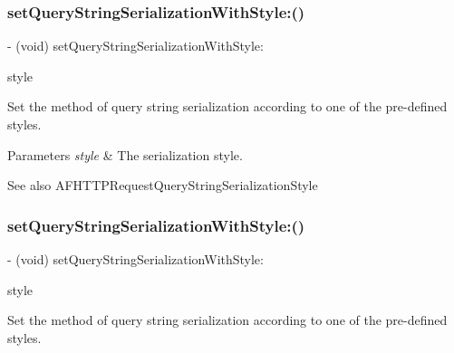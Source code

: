 \subsubsection{\texorpdfstring{set\+Query\+String\+Serialization\+With\+Style\+:()}{setQueryStringSerializationWithStyle:()}\hspace{0.1cm}{\footnotesize\ttfamily [1/3]}}
{\footnotesize\ttfamily -\/ (void) set\+Query\+String\+Serialization\+With\+Style\+: \begin{DoxyParamCaption}\item[{(A\+F\+H\+T\+T\+P\+Request\+Query\+String\+Serialization\+Style)}]{style }\end{DoxyParamCaption}}

Set the method of query string serialization according to one of the pre-\/defined styles.


\begin{DoxyParams}{Parameters}
{\em style} & The serialization style.\\
\hline
\end{DoxyParams}
\begin{DoxySeeAlso}{See also}
A\+F\+H\+T\+T\+P\+Request\+Query\+String\+Serialization\+Style 
\end{DoxySeeAlso}
\mbox{\label{interface_a_f_h_t_t_p_request_serializer_af86bfabe2989e5730b187fe5f2f2a9e7}} 
\subsubsection{\texorpdfstring{set\+Query\+String\+Serialization\+With\+Style\+:()}{setQueryStringSerializationWithStyle:()}\hspace{0.1cm}{\footnotesize\ttfamily [2/3]}}
{\footnotesize\ttfamily -\/ (void) set\+Query\+String\+Serialization\+With\+Style\+: \begin{DoxyParamCaption}\item[{(A\+F\+H\+T\+T\+P\+Request\+Query\+String\+Serialization\+Style)}]{style }\end{DoxyParamCaption}}

Set the method of query string serialization according to one of the pre-\/defined styles.


